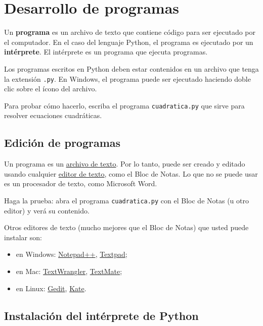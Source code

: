 \chapter{Desarrollo de programas}

Un \textbf{programa} es un archivo de texto que contiene código para ser
ejecutado por el computador.
En el caso del lenguaje Python, el programa es ejecutado por un
\textbf{intérprete}. El intérprete es un programa que ejecuta programas.

Los programas escritos en Python deben estar contenidos en un archivo
que tenga la extensión \lstinline!.py!. En Windows, el programa puede
ser ejecutado haciendo doble clic sobre el ícono del archivo.

Para probar cómo hacerlo, escriba el programa \verb!cuadratica.py!
que sirve para resolver ecuaciones cuadráticas.

\section{Edición de programas}

Un programa es un
\href{http://es.wikipedia.org/wiki/Archivo\_de\_texto}{archivo de
texto}. Por lo tanto, puede ser creado y editado usando cualquier
\href{http://es.wikipedia.org/wiki/Editor\_de\_texto}{editor de texto},
como el Bloc de Notas.
Lo que no se puede usar es un procesador de texto, como Microsoft Word.

Haga la prueba: abra el programa \lstinline!cuadratica.py! con el Bloc
de Notas (u otro editor) y verá su contenido.

Otros editores de texto (mucho mejores que el Bloc de Notas) que usted
puede instalar son:

\begin{itemize}
\item
  en Windows: \href{http://notepad-plus-plus.org/}{Notepad++},
  \href{http://www.textpad.com/}{Textpad};
\item
  en Mac:
  \href{http://www.barebones.com/products/textwrangler/}{TextWrangler},
  \href{http://macromates.com/}{TextMate};
\item
  en Linux: \href{http://projects.gnome.org/gedit/}{Gedit},
  \href{http://kate-editor.org/}{Kate}.
\end{itemize}

\section{Instalación del intérprete de Python}

